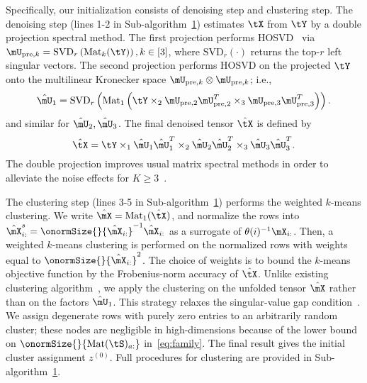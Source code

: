 \documentclass[lettersize,onecolumn,journal]{IEEEtran}
\theoremstyle{definition}
\theoremstyle{definition}
\newcommand{\of}[1]{\left(#1\right)}
\begin{document}
Specifically, our initialization consists of denoising step and clustering step. The denoising step (lines 1-2 in Sub-algorithm~\hyperref[alg:main]{1}) estimates $\tX$ from $\tY$ by a double projection spectral method.  
The first projection performs HOSVD~\citep{de2000multilinear} via $\mU_{\text{pre},k} = \text{SVD}_{r} \of{ \text{Mat}_k(\tY) }, k \in [3]$, where $\text{SVD}_r(\cdot)$ returns the top-$r$ left singular vectors. The second projection performs HOSVD on the projected $\tY$ onto the multilinear Kronecker space $\mU_{\text{pre},k} \otimes  \mU_{\text{pre},k}$; i.e.,
\begin{equation}\label{eq:two-step_factor}
    \hat \mU_1 = \text{SVD}_{r} \of{\text{Mat}_1\of{ \tY\times_2  \mU_{\text{pre},2} \mU_{\text{pre},2}^T \times_3   \mU_{\text{pre},3} \mU_{\text{pre},3}^T }}.
\end{equation}
and similar for $ \hat \mU_2 ,  \hat \mU_3 $.
The final denoised tensor $\hat \tX$ is defined by
\begin{equation}\label{eq:two-step_est}
    \hat \tX = \tY \times_1 \hat \mU_1 \hat 
\mU^T_1 \times_2 \hat \mU_2 \hat \mU^T_2 \times_3 \hat \mU_3 \hat \mU^T_3. 
\end{equation}
The double projection improves usual matrix spectral methods in order to alleviate the noise effects for $K\geq 3$~\citep{han2020exact}.

The clustering step (lines 3-5 in Sub-algorithm~\hyperref[alg:main]{1}) performs the weighted $k$-means clustering. 
We write $\hat \mX=\text{Mat}_1(\hat \tX)$, and normalize the rows into $\hat \mX^s_{i:}=\onormSize{}{\hat \mX_{i:}}^{-1}\hat \mX_{i:}$ as a surrogate of $\theta(i)^{-1} \mX_{i:}$. Then, a weighted $k$-means clustering is performed on the normalized rows with weights equal to $\onormSize{}{\hat \mX_{i:}}^2$. The choice of weights is to bound the $k$-means objective function by the Frobenius-norm accuracy of $\hat \tX$. Unlike existing clustering algorithm~\citep{ke2019community}, we apply the clustering on the unfolded tensor $\hat \mX$ rather than on the factors $\hat \mU_1$. This strategy relaxes the singular-value gap condition~\citep{gao2018community, han2020exact}.
We assign degenerate rows with purely zero entries to an arbitrarily random cluster; these nodes are negligible in high-dimensions because of the lower bound on $\onormSize{}{\text{Mat}(\tS)_{a:}}$ in~\eqref{eq:family}. The final result gives the initial cluster assignment $z^{(0)}$. Full procedures for clustering are provided in Sub-algorithm~\hyperref[alg:main]{1}. 
\end{document}
